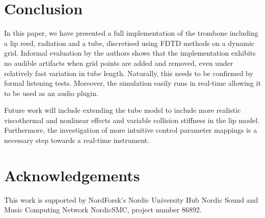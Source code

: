 \section{Conclusion}\label{sec:conclusion}
In this paper, we have presented a full implementation of the trombone including a lip reed, radiation and a tube, discretised using FDTD methods on a dynamic grid. Informal evaluation by the authors shows that the implementation exhibits no audible artifacts when grid points are added and removed, even under relatively fast variation in tube length. Naturally, this needs to be confirmed by formal listening tests. Moreover, the simulation easily runs in real-time allowing it to be used as an audio plugin. 

Future work will include extending the tube model to include more realistic viscothermal and nonlinear effects and variable collision stiffness in the lip model. Furthermore, the investigation of more intuitive control parameter mappings is a necessary step towards a real-time instrument.

\section{Acknowledgements}
This work is supported by NordForsk's Nordic
University Hub Nordic Sound and Music Computing Network
NordicSMC, project number 86892.